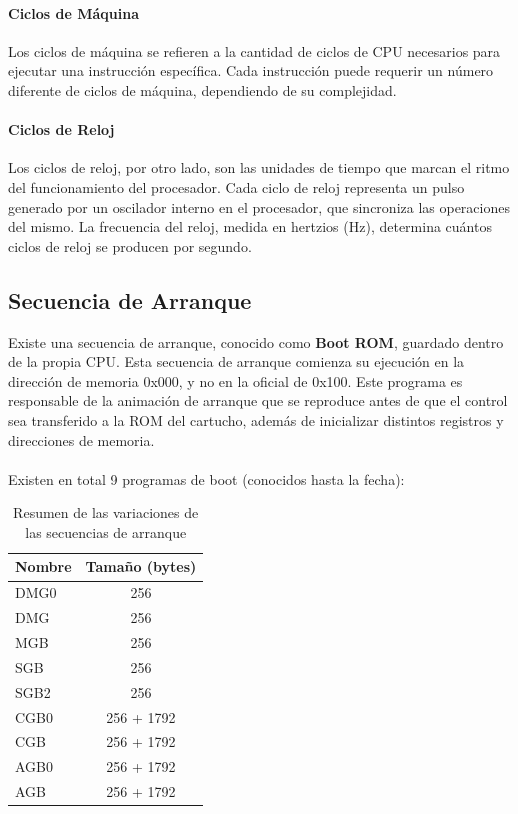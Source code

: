 \paragraph{Ciclos de Máquina}
Los ciclos de máquina se refieren a la cantidad de ciclos de CPU necesarios para ejecutar una instrucción específica. Cada instrucción puede requerir un número diferente de ciclos de máquina, dependiendo de su complejidad.

\paragraph{Ciclos de Reloj}
Los ciclos de reloj, por otro lado, son las unidades de tiempo que marcan el ritmo del funcionamiento del procesador. Cada ciclo de reloj representa un pulso generado por un oscilador interno en el procesador, que sincroniza las operaciones del mismo. La frecuencia del reloj, medida en hertzios (Hz), determina cuántos ciclos de reloj se producen por segundo.

\subsection{Secuencia de Arranque}

Existe una secuencia de arranque, conocido como \textbf{Boot ROM}, guardado dentro de la propia CPU. Esta secuencia de arranque comienza su ejecución en la dirección de memoria 0x000, y no en la oficial de 0x100. Este programa es responsable de la animación de arranque que se reproduce antes de que el control sea transferido a la ROM del cartucho, además de inicializar distintos registros y direcciones de memoria.
\\\\
Existen en total 9 programas de boot (conocidos hasta la fecha):
\begin{table}[h!]
\centering
\begin{tabular}{|l|c|}
\hline
\textbf{Nombre} & \textbf{Tamaño (bytes)} \\ \hline
DMG0 & 256 \\ \hline
DMG  & 256 \\ \hline
MGB  & 256 \\ \hline
SGB  & 256 \\ \hline
SGB2 & 256 \\ \hline
CGB0 & 256 + 1792 \\ \hline
CGB  & 256 + 1792 \\ \hline
AGB0 & 256 + 1792 \\ \hline
AGB  & 256 + 1792 \\ \hline
\end{tabular}
\caption{Resumen de las variaciones de las secuencias de arranque}
\end{table}

